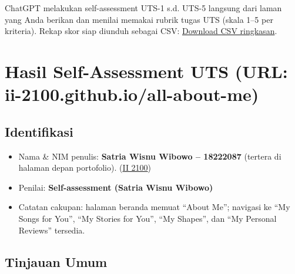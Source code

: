 \documentclass[
  letterpaper,
  DIV=11,
  numbers=noendperiod]{scrreprt}
\providecommand{\tightlist}{%
  \setlength{\itemsep}{0pt}\setlength{\parskip}{0pt}}
\begin{document}
ChatGPT melakukan self-assessment UTS-1 s.d. UTS-5 langsung dari laman
yang Anda berikan dan menilai memakai rubrik tugas UTS (skala 1--5 per
kriteria). Rekap skor siap diunduh sebagai CSV:
\href{sandbox:/mnt/data/UTS_self_assessment.csv}{Download CSV
ringkasan}.


\chapter{Hasil Self-Assessment UTS (URL:
ii-2100.github.io/all-about-me)}\label{hasil-self-assessment-uts-url-ii-2100.github.ioall-about-me}

\section{Identifikasi}\label{identifikasi}

\begin{itemize}
\tightlist
\item
  Nama \& NIM penulis: \textbf{Satria Wisnu Wibowo -- 18222087} (tertera
  di halaman depan portofolio).
  (\href{https://ii-2100.github.io/all-about-me/}{II 2100})
\item
  Penilai: \textbf{Self-assessment (Satria Wisnu Wibowo)}
\item
  Catatan cakupan: halaman beranda memuat ``About Me''; navigasi ke ``My
  Songs for You'', ``My Stories for You'', ``My Shapes'', dan ``My
  Personal Reviews'' tersedia.
\end{itemize}

\section{Tinjauan Umum}\label{tinjauan-umum}
\end{document}
